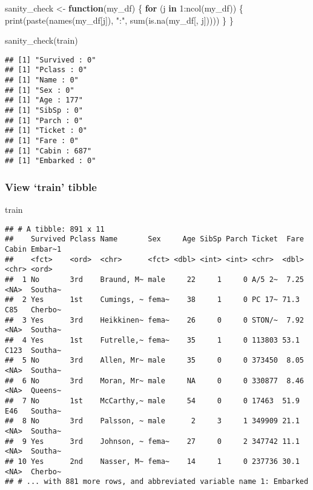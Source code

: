\documentclass[
]{article}
\newenvironment{Shaded}{\begin{snugshade}}{\end{snugshade}}
\newcommand{\ControlFlowTok}[1]{\textcolor[rgb]{0.13,0.29,0.53}{\textbf{#1}}}
\newcommand{\DecValTok}[1]{\textcolor[rgb]{0.00,0.00,0.81}{#1}}
\newcommand{\FunctionTok}[1]{\textcolor[rgb]{0.00,0.00,0.00}{#1}}
\newcommand{\NormalTok}[1]{#1}
\newcommand{\OtherTok}[1]{\textcolor[rgb]{0.56,0.35,0.01}{#1}}
\newcommand{\SpecialCharTok}[1]{\textcolor[rgb]{0.00,0.00,0.00}{#1}}
\newcommand{\StringTok}[1]{\textcolor[rgb]{0.31,0.60,0.02}{#1}}
\begin{document}
\begin{Shaded}
\begin{Highlighting}[]
\NormalTok{sanity\_check }\OtherTok{\textless{}{-}} \ControlFlowTok{function}\NormalTok{(my\_df) \{}
  \ControlFlowTok{for}\NormalTok{ (j }\ControlFlowTok{in} \DecValTok{1}\SpecialCharTok{:}\FunctionTok{ncol}\NormalTok{(my\_df)) \{}
    \FunctionTok{print}\NormalTok{(}\FunctionTok{paste}\NormalTok{(}\FunctionTok{names}\NormalTok{(my\_df[j]), }\StringTok{":"}\NormalTok{, }\FunctionTok{sum}\NormalTok{(}\FunctionTok{is.na}\NormalTok{(my\_df[, j]))))}
\NormalTok{  \}}
\NormalTok{\}}

\FunctionTok{sanity\_check}\NormalTok{(train)}
\end{Highlighting}
\end{Shaded}

\begin{verbatim}
## [1] "Survived : 0"
## [1] "Pclass : 0"
## [1] "Name : 0"
## [1] "Sex : 0"
## [1] "Age : 177"
## [1] "SibSp : 0"
## [1] "Parch : 0"
## [1] "Ticket : 0"
## [1] "Fare : 0"
## [1] "Cabin : 687"
## [1] "Embarked : 0"
\end{verbatim}

\hypertarget{view-train-tibble}{%
\subsubsection{View `train' tibble}\label{view-train-tibble}}

\begin{Shaded}
\begin{Highlighting}[]
\NormalTok{train}
\end{Highlighting}
\end{Shaded}

\begin{verbatim}
## # A tibble: 891 x 11
##    Survived Pclass Name       Sex     Age SibSp Parch Ticket  Fare Cabin Embar~1
##    <fct>    <ord>  <chr>      <fct> <dbl> <int> <int> <chr>  <dbl> <chr> <ord>  
##  1 No       3rd    Braund, M~ male     22     1     0 A/5 2~  7.25 <NA>  Southa~
##  2 Yes      1st    Cumings, ~ fema~    38     1     0 PC 17~ 71.3  C85   Cherbo~
##  3 Yes      3rd    Heikkinen~ fema~    26     0     0 STON/~  7.92 <NA>  Southa~
##  4 Yes      1st    Futrelle,~ fema~    35     1     0 113803 53.1  C123  Southa~
##  5 No       3rd    Allen, Mr~ male     35     0     0 373450  8.05 <NA>  Southa~
##  6 No       3rd    Moran, Mr~ male     NA     0     0 330877  8.46 <NA>  Queens~
##  7 No       1st    McCarthy,~ male     54     0     0 17463  51.9  E46   Southa~
##  8 No       3rd    Palsson, ~ male      2     3     1 349909 21.1  <NA>  Southa~
##  9 Yes      3rd    Johnson, ~ fema~    27     0     2 347742 11.1  <NA>  Southa~
## 10 Yes      2nd    Nasser, M~ fema~    14     1     0 237736 30.1  <NA>  Cherbo~
## # ... with 881 more rows, and abbreviated variable name 1: Embarked
\end{verbatim}
\end{document}
